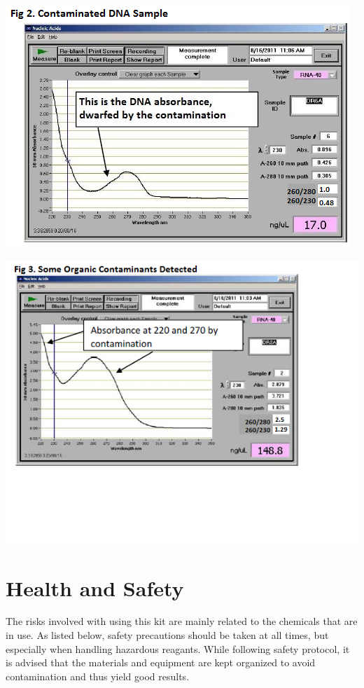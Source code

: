 \documentclass[12pt]{../SOP3_alpha}\usepackage[]{graphicx}\usepackage[]{color}
\begin{document}
\begin{description}
\includegraphics[scale=1]{NanoDropContaminated.png}

\includegraphics[scale=1]{Fig3OrganicContaminants.png}

\end{description}

\section{Health and Safety}

\NP The risks involved with using this kit are mainly related to the chemicals that are in use. As listed below, safety precautions should be taken at all times, but especially when handling hazardous reagants. While following safety protocol, it is advised that the materials and equipment are kept organized to avoid contamination and thus yield good results. 
\end{document}
